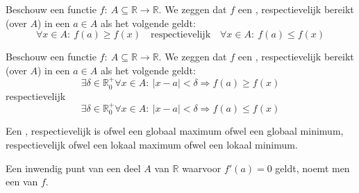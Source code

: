 \documentclass[main.tex]{subfiles}
\begin{document}
\begin{de}
  Beschouw een functie $f:\ A \subseteq \mathbb{R} \rightarrow \mathbb{R}$.
  We zeggen dat $f$ een , respectievelijk  bereikt (over $A$) in een $a\in A$ als het volgende geldt:
  \[ \forall x\in A:\ f(a) \ge f(x) \quad\text{respectievelijk}\quad \forall x\in A:\ f(a) \le f(x)\]
\end{de}

\begin{de}
  Beschouw een functie $f:\ A \subseteq \mathbb{R} \rightarrow \mathbb{R}$.
  We zeggen dat $f$ een , respectievelijk  bereikt (over $A$) in een $a\in A$ als het volgende geldt:
  \[ \exists \delta \in \mathbb{R}_{0}^{+}\forall x\in A:\ |x-a| < \delta \Rightarrow f(a) \ge f(x)\]
  respectievelijk
  \[ \exists \delta \in \mathbb{R}_{0}^{+}\forall x\in A:\ |x-a| < \delta \Rightarrow f(a) \le f(x)\]
\end{de}

\begin{de}
  Een , respectievelijk  is ofwel een globaal maximum ofwel een globaal minimum, respectievelijk ofwel een lokaal maximum ofwel een lokaal minimum.
\end{de}

\begin{de}
  Een inwendig punt van een deel $A$ van $\mathbb{R}$ waarvoor $f'(a)=0$ geldt, noemt men een  van $f$.
\end{de}
\end{document}
